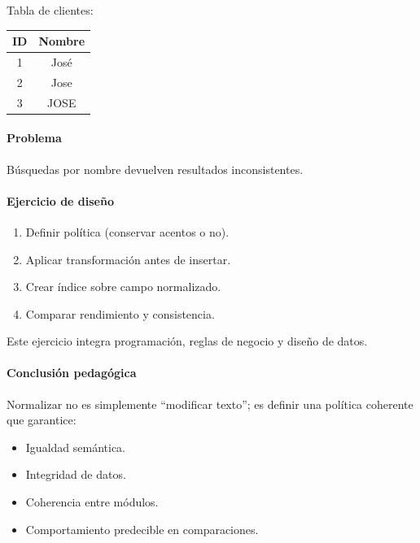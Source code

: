 \documentclass[12pt,twoside]{book}
\begin{document}
						\noindent
						Tabla de clientes:
						
						\begin{center}
							\begin{tabular}{|c|c|}
								\hline
								ID & Nombre \\
								\hline
								1 & José \\
								2 & Jose \\
								3 & JOSE \\
								\hline
							\end{tabular}
						\end{center}
						
						\paragraph{Problema}
						
						Búsquedas por nombre devuelven resultados inconsistentes.
						
						\paragraph{Ejercicio de diseño}
						
						\begin{enumerate}
							\item Definir política (conservar acentos o no).
							\item Aplicar transformación antes de insertar.
							\item Crear índice sobre campo normalizado.
							\item Comparar rendimiento y consistencia.
						\end{enumerate}
						
						\noindent
						Este ejercicio integra programación, reglas de negocio y diseño de datos.
						
						\paragraph{Conclusión pedagógica}
						
						Normalizar no es simplemente “modificar texto”; es definir una política coherente que garantice:
						
						\begin{itemize}
							\item Igualdad semántica.
							\item Integridad de datos.
							\item Coherencia entre módulos.
							\item Comportamiento predecible en comparaciones.
						\end{itemize}
						
\end{document}
